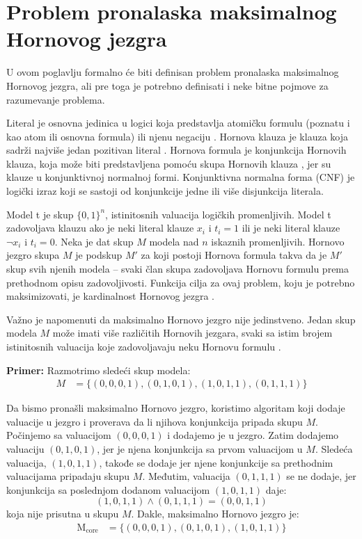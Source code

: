 \documentclass[12pt,oneside]{memoir}
\begin{document}
\newpage



\section{Problem pronalaska maksimalnog Hornovog jezgra}
U ovom poglavlju formalno će biti definisan problem pronalaska maksimalnog Hornovog jezgra, ali pre toga je potrebno definisati i neke bitne pojmove za razumevanje problema.

Literal je osnovna jedinica u logici koja predstavlja atomičku formulu (poznatu i kao atom ili osnovna formula) ili njenu negaciju \cite{doc_lit}.  Hornova klauza je klauza koja sadrži najviše jedan pozitivan literal \cite{doc_horn_clause}. Hornova formula je konjunkcija Hornovih klauza, koja može biti predstavljena pomoću skupa Hornovih klauza \cite{doc3}, jer su klauze u konjunktivnoj normalnoj formi. Konjunktivna normalna forma (CNF) je logički izraz koji se sastoji od konjunkcije jedne ili više disjunkcija literala.


Model t je skup $\{0, 1\}^n$, istinitosnih valuacija logičkih promenljivih. Model t zadovoljava klauzu ako je neki literal klauze $x_i$ i $t_i=1$ ili je neki literal klauze $\neg x_i$ i $t_i=0$. Neka je dat skup $M$ modela nad $n$ iskaznih promenljivih. Hornovo jezgro skupa $M$ je podskup $M'$ za koji postoji Hornova formula takva da je $M'$ skup svih njenih modela -- svaki član skupa zadovoljava Hornovu formulu prema prethodnom opisu zadovoljivosti. Funkcija cilja za ovaj problem, koju je potrebno maksimizovati, je kardinalnost Hornovog jezgra \cite{doc3,HCproblem}.

Važno je napomenuti da maksimalno Hornovo jezgro nije jedinstveno. Jedan skup modela $M$ može imati više različitih Hornovih jezgara, svaki sa istim brojem istinitosnih valuacija koje zadovoljavaju neku Hornovu formulu \cite{doc3}.

\textbf{Primer:} Razmotrimo sledeći skup modela:
\begin{align*}
M &= \{ (0, 0, 0, 1), (0, 1, 0, 1), (1, 0, 1, 1), (0, 1, 1, 1) \}
\end{align*}

Da bismo pronašli maksimalno Hornovo jezgro, koristimo algoritam koji dodaje valuacije u jezgro i proverava da li njihova konjunkcija pripada skupu \(M\). Počinjemo sa valuacijom \((0, 0, 0, 1)\) i dodajemo je u jezgro. Zatim dodajemo valuaciju \((0, 1, 0, 1)\), jer je njena konjunkcija sa prvom valuacijom u \(M\). Sledeća valuacija, \((1, 0, 1, 1)\), takođe se dodaje jer njene konjunkcije sa prethodnim valuacijama pripadaju skupu \(M\). Međutim, valuacija \((0, 1, 1, 1)\) se ne dodaje, jer konjunkcija sa poslednjom dodanom valuacijom \((1, 0, 1, 1)\) daje:
\[
(1, 0, 1, 1) \land (0, 1, 1, 1) = (0, 0, 1, 1)
\] koja nije prisutna u skupu \(M\). Dakle, maksimalno Hornovo jezgro je:
\begin{align*}
\text{M}_{\text{core}} &= \{ (0, 0, 0, 1), (0, 1, 0, 1), (1, 0, 1, 1) \}
\end{align*}
\end{document}
